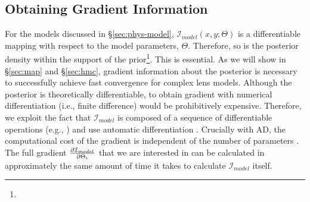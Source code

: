 

\subsection{Obtaining Gradient Information}\label{sec:ad}
For the models discussed in \S\ref{sec:phys-model}, $\mathcal{I}_{model}(x, y; \Theta)$ is a differentiable mapping with respect to the model parameters, $\Theta$. Therefore, so is the posterior density  within the support of the prior\footnote{}. This is essential. As we will show in \S\ref{sec:map} and \S\ref{sec:hmc}, gradient information about the posterior is 
necessary to successfully achieve fast convergence for complex lens models. Although the posterior is theoretically differentiable, to obtain gradient with numerical differentiation (i.e., finite difference) would be prohibitively expensive.
Therefore, we exploit the fact that  $\mathcal{I}_{model}$ is composed of a sequence of differentiable operations (e.g., ) and use automatic differentiation \citep[AD;][]{wengert1964}. 
Crucially with AD, the  computational cost of  the gradient is independent of the number of parameters \citep{baydin2018}. The full gradient $\pdv{\mathcal{I}_{model}}{\Theta_i}$ that we are interested in can be calculated in approximately the same amount of time it takes to calculate $\mathcal{I}_{model}$ itself.

